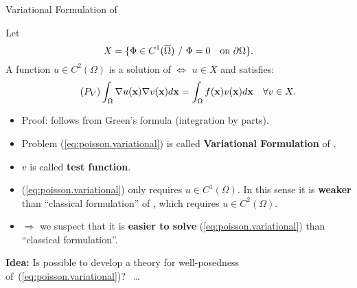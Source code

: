 \begin{frame}{Variational Formulation of \poissonProblem}
  \small
  \begin{proposition}
  Let
  $$
  X=\{ \Phi\in C^1(\overline\Omega) \ / \  \Phi=0 \quad \mbox{on } \partial\Omega\}.
  $$
  A function $u\in C^2(\Omega)$ is a solution of \poissonProblem $\mathbf\Longleftrightarrow$ $u\in X$ and satisfies:
  \begin{equation}
    \tag{\ensuremath{P_V}}
    \int_\Omega \grad u(\xx) \grad v(\xx) d\xx = \int_\Omega f(\xx) v(\xx) d\xx \quad \forall v\in X.
    \label{eq:poisson.variational}
  \end{equation}
  \end{proposition}
  \begin{itemize}
  \item Proof: follows from Green's formula (integration by parts).
  \item Problem (\ref{eq:poisson.variational}) is called
    \alert{\textbf{Variational Formulation}} of \poissonProblem.
  \item $v$ is called \textbf{test function}.
  \item (\ref{eq:poisson.variational}) only requires
    $u\in C^1(\Omega)$. In this sense it is \textbf{weaker} than ``classical
    formulation'' of \poissonProblem, which requires $u\in C^2(\Omega)$.
  \item $\Rightarrow$ we suspect that it is \textbf{easier to solve}
    (\ref{eq:poisson.variational}) than ``classical formulation''.
  \end{itemize}
  \vspace{-1em}
  \begin{BlockNoTitle}
    \begin{center}
      \textbf{Idea:} Is possible to develop a theory for
      well-posedness of~(\ref{eq:poisson.variational})? \ \dots
    \end{center}
  \end{BlockNoTitle}
\end{frame}

